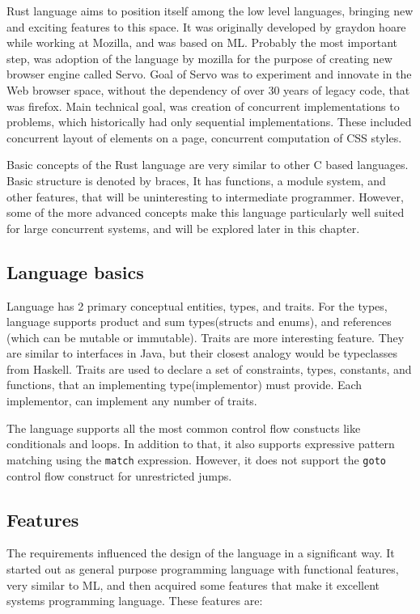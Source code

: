 Rust language aims to position itself among the low level languages, bringing new and exciting features to this space.
It was originally developed by graydon hoare\cite{web:rust_progress} while working at Mozilla, and was based on
ML. Probably the most important step, was adoption of the language by mozilla for the purpose of creating new browser engine
called Servo\cite{proc:servo}. Goal of Servo was to experiment and innovate in the Web browser space, without
the dependency of over 30 years of legacy code, that was firefox. Main technical goal, was creation of
concurrent implementations to problems, which historically had only sequential implementations. These included
concurrent layout of elements on a page, concurrent computation of CSS styles.


Basic concepts of the Rust language are very similar to other C based languages. Basic structure is denoted by braces,
It has functions, a module system, and other features, that will be uninteresting to intermediate programmer.
However, some of the more advanced concepts make this language particularly well suited for large concurrent systems, and
will be explored later in this chapter.

\subsection{Language basics}
Language has 2 primary conceptual entities, types, and traits.
For the types, language supports product and sum types(structs and enums), and references (which can be mutable or immutable).
Traits are more interesting feature. They are similar to interfaces in Java, but their closest analogy would be typeclasses from Haskell.
Traits are used to declare a set of constraints, types, constants, and functions, that an implementing type(implementor) must provide.
Each implementor, can implement any number of traits.

The language supports all the most common control flow constucts like conditionals and loops. In addition to that, it
also supports expressive pattern matching using the \verb|match| expression. However, it does not support the
\verb|goto| control flow construct for unrestricted jumps.

\subsection{Features}
The requirements influenced the design of the language in a significant way. It started out as general purpose programming
language with functional features, very similar to ML, and then acquired some features that make it excellent
systems programming language. These features are:

